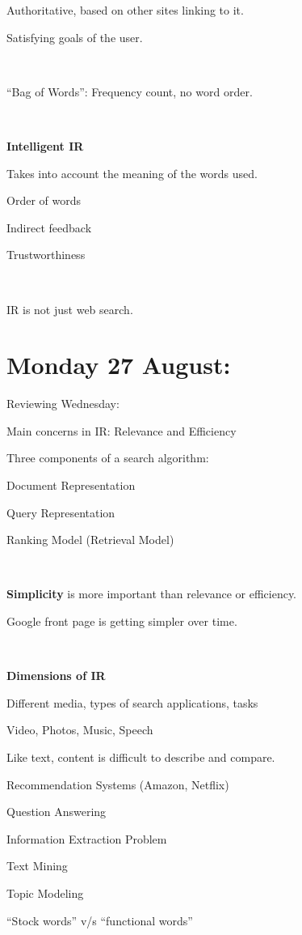 \documentclass[11pt]{article}
\begin{document}
\begin{spacing}{1.2}
Authoritative, based on other sites linking to it.  

Satisfying goals of the user.  

\

``Bag of Words'':  Frequency count, no word order.  

\

{\bf Intelligent IR}


Takes into account the meaning of the words used.  

Order of words

Indirect feedback

Trustworthiness

\

IR is not just web search.  

\section{Monday 27 August:  }

Reviewing Wednesday:

\qquad Main concerns in IR:  Relevance and Efficiency

\qquad Three components of a search algorithm:  

\qquad \qquad Document Representation

\qquad \qquad Query Representation

\qquad \qquad Ranking Model (Retrieval Model)

\

{\bf Simplicity} is more important than relevance or efficiency.  

Google front page is getting simpler over time.  

\

{\bf Dimensions of IR}

Different media, types of search applications, tasks

\qquad Video, Photos, Music, Speech

\qquad Like text, content is difficult to describe and compare.  


Recommendation Systems (Amazon, Netflix)

Question Answering

\qquad Information Extraction Problem

Text Mining 

\qquad Topic Modeling
	
\qquad ``Stock words'' v/s ``functional words''

\


\end{spacing}
\end{document}
